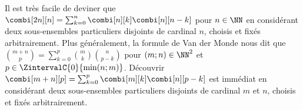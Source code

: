 

\begin{remark}
    Il est très facile de deviner que
    $\combi[2n][n] = \sum_{k=0}^{n} \combi[n][k] \combi[n][n-k]$ pour $n \in \NN$
    en considérant deux sous-ensembles particuliers disjoints de cardinal $n$, choisis et fixés arbitrairement.
    Plus généralement,
    la formule de Van der Monde nous dit que
    $\binom{m + n}{p} = \sum_{k=0}^p \binom{m}{k} \binom{n}{p-k}$
    pour $(m ; n) \in \NN^2$ et $p \in \ZintervalC{0}{\min(n ; m)}$.
    Découvrir
    $\combi[m + n][p] = \sum_{k=0}^p \combi[m][k] \combi[n][p-k]$
    est immédiat en considérant deux sous-ensembles particuliers disjoints de cardinal $m$ et $n$, choisis et fixés arbitrairement.
\end{remark}
